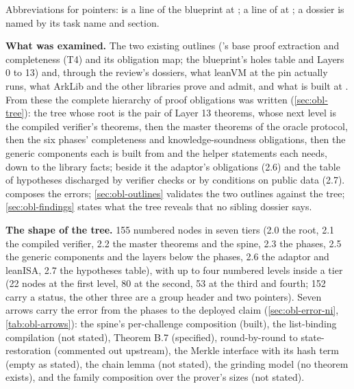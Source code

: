 Abbreviations for pointers:  is a line of the blueprint at ;  a line of  at ; a dossier is named by its task name and section.

\textbf{What was examined.} The two existing outlines ('s base proof extraction and completeness (T4) and its obligation map; the blueprint's holes table and Layers 0 to 13) and, through the review's dossiers, what leanVM at the pin actually runs, what ArkLib and the other libraries prove and admit, and what is built at . From these the complete hierarchy of proof obligations was written (\cref{sec:obl-tree}): the tree whose root is the pair of Layer 13 theorems, whose next level is the compiled verifier's theorems, then the master theorems of the oracle protocol, then the six phases' completeness and knowledge-soundness obligations, then the generic components each is built from and the helper statements each needs, down to the library facts; beside it the adaptor's obligations (2.6) and the table of hypotheses discharged by verifier checks or by conditions on public data (2.7).  composes the errors; \cref{sec:obl-outlines} validates the two outlines against the tree; \cref{sec:obl-findings} states what the tree reveals that no sibling dossier says.

\textbf{The shape of the tree.} 155 numbered nodes in seven tiers (2.0 the root, 2.1 the compiled verifier, 2.2 the master theorems and the spine, 2.3 the phases, 2.5 the generic components and the layers below the phases, 2.6 the adaptor and leanISA, 2.7 the hypotheses table), with up to four numbered levels inside a tier (22 nodes at the first level, 80 at the second, 53 at the third and fourth; 152 carry a status, the other three are a group header and two pointers). Seven arrows carry the error from the phases to the deployed claim (\cref{sec:obl-error-ni}, \cref{tab:obl-arrows}): the spine's per-challenge composition (built), the list-binding compilation (not stated), Theorem B.7 (specified), round-by-round to state-restoration (commented out upstream), the Merkle interface with its hash term (empty as stated), the chain lemma (not stated), the grinding model (no theorem exists), and the family composition over the prover's sizes (not stated).

